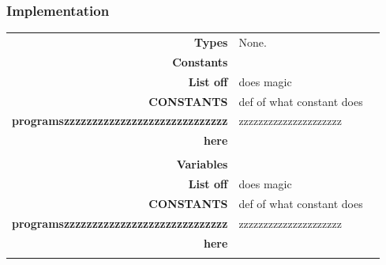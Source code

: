 \documentclass[10pt]{article}
\begin{document}
    \subsubsection{Implementation}
        \begin{tabularx}{\linewidth}{ >{\bfseries}r Xp{5cm} }
            Types           & None. \\
            
            Constants       & \begin{tabular}[t]{@{} l p{8cm}} 
                                 & \\
                                List off & does magic \\
                                CONSTANTS & def of what constant does \\
                                programszzzzzzzzzzzzzzzzzzzzzzzzzzzzz & zzzzzzzzzzzzzzzzzzzzz \\
                                here & \\ 
                            \end{tabular} \\
                              
            Variables       & \begin{tabular}[t]{@{} l p{8cm}} 
                                     & \\
                                    List off & does magic \\
                                    CONSTANTS & def of what constant does \\
                                    programszzzzzzzzzzzzzzzzzzzzzzzzzzzzz & zzzzzzzzzzzzzzzzzzzzz \\
                                    here & \\ 
                              \end{tabular} \\


\end{tabularx}
\end{document}
